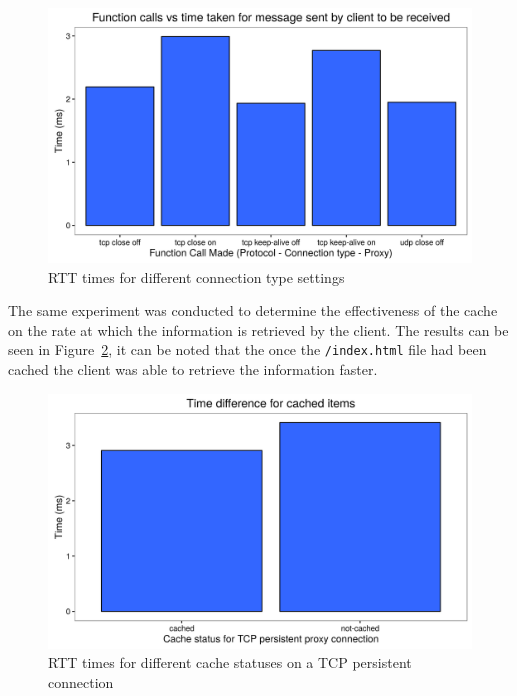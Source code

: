 \documentclass[10pt,twocolumn]{witseiepaper}
\begin{document}
		\begin{figure}[htbp]
			\centering
			\includegraphics[width=\columnwidth]{resources/RTT.png}
			\caption{RTT times for different connection type settings}
			\label{fig:rtt}
		\end{figure}
		
		The same experiment was conducted to determine the effectiveness of the cache on the rate at which the information is retrieved by the client. The results can be seen in Figure~\ref{fig:rtt_cache}, it can be noted that the once the \texttt{/index.html} file had been cached the client was able to retrieve the information faster.
		
		\begin{figure}[htbp]
			\centering
			\includegraphics[width=\columnwidth]{resources/RTT_cache.png}
			\caption{RTT times for different cache statuses on a TCP persistent connection}
			\label{fig:rtt_cache}
		\end{figure}


\end{document}
